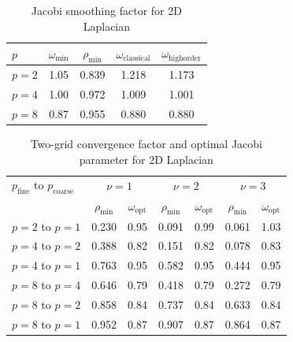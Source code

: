 \documentclass[review]{siamart190516}
\begin{document}
\begin{table}[ht!]
\begin{center}
\begin{tabular}{l c c c c}
  \toprule
  $p$       &  $\omega_{\min}$  &  $\rho_{\min}$  &  $\omega_{\text{classical}}$  &  $\omega_{\text{highorder}}$  \\
  \midrule
  $p = 2$   &  1.05  &  0.839  & 1.218  &  1.173  \\
  $p = 4$   &  1.00  &  0.972  & 1.009  &  1.001  \\
  $p = 8$   &  0.87  &  0.955  & 0.880  &  0.880  \\
  \bottomrule
\end{tabular}
\end{center}
\caption{Jacobi smoothing factor for 2D Laplacian}
\label{table:smoothing_factor_2d_jacobi}
\end{table}

\begin{table}[ht!]
\begin{center}
\begin{tabular}{l cc cc cc}
  \toprule
  $p_{\text{fine}}$ to $p_{\text{coarse}}$  &  \multicolumn{2}{c}{$\nu = 1$}  &  \multicolumn{2}{c}{$\nu = 2$}  &  \multicolumn{2}{c}{$\nu = 3$}  \\
                      &  $\rho_{\min}$  &  $\omega_{\text{opt}}$  &  $\rho_{\min}$ & $\omega_{\text{opt}}$  &  $\rho_{\min}$ & $\omega_{\text{opt}}$  \\
  \toprule
  $p = 2$ to $p = 1$  &  0.230 & 0.95  &  0.091 & 0.99  &  0.061 & 1.03   \\
  \midrule
  $p = 4$ to $p = 2$  &  0.388 & 0.82  &  0.151 & 0.82  &  0.078 & 0.83   \\
  $p = 4$ to $p = 1$  &  0.763 & 0.95  &  0.582 & 0.95  &  0.444 & 0.95   \\
  \midrule
  $p = 8$ to $p = 4$  &  0.646 & 0.79  &  0.418 & 0.79  &  0.272 & 0.79   \\
  $p = 8$ to $p = 2$  &  0.858 & 0.84  &  0.737 & 0.84  &  0.633 & 0.84   \\
  $p = 8$ to $p = 1$  &  0.952 & 0.87  &  0.907 & 0.87  &  0.864 & 0.87   \\
  \bottomrule
\end{tabular}
\end{center}
\caption{Two-grid convergence factor and optimal Jacobi parameter for 2D Laplacian}
\label{table:two_grid_2d}
\end{table}
\end{document}

